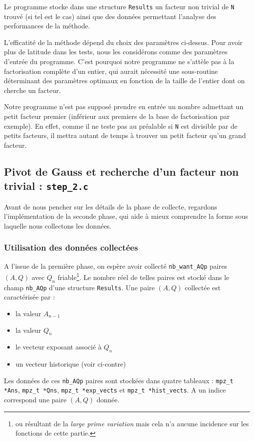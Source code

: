 Le programme stocke dans une structure \texttt{Results} un facteur non trivial
de \texttt{N} trouvé (si tel est le cas) ainsi que des données permettant 
l'analyse des performances de la méthode.  

\begin{remarque}
L'efficatité de la méthode dépend du choix des paramètres ci-dessus. Pour avoir
plus de latitude dans les tests, nous les considérons comme des paramètres 
d'entrée du programme. C'est pourquoi notre programme ne s'attèle pas à la
factorisation complète d'un entier, qui aurait nécessité une sous-routine 
déterminant des paramètres optimaux en fonction de la taille de l'entier 
dont on cherche un facteur. 
   
\end{remarque}

\begin{remarque}
Notre programme n'est pas supposé prendre en entrée un nombre admettant un petit
facteur premier (inférieur aux premiers de la base de factorisation par exemple).
En effet, comme il ne teste pas au préalable si \texttt{N} est divisible par de 
petits facteurs, il mettra autant de temps à trouver un petit facteur qu'un
grand facteur.
\end{remarque}

\newpage 
\subsection{Pivot de Gauss et recherche d'un facteur non trivial
            : \texttt{step\_2.c}}

Avant de nous pencher sur les détails de la phase de collecte, regardons 
l'implémentation de la seconde phase, qui aide à mieux comprendre la 
forme sous laquelle nous collectons les données.

\subsubsection{Utilisation des données collectées}
A l'issue de la première
phase, on espère avoir collecté \texttt{nb\_want\_AQp} paires $(A,Q)$ avec
$Q_n$ friable\footnote{ou résultant de la \textit{large prime variation} mais 
cela n'a aucune incidence sur les fonctions de cette partie.}. Le nombre
réel de telles paires est stocké dans le champ \texttt{nb\_AQp} d'une structure
\texttt{Results}. Une paire $(A,Q)$ collectée est caractérisée par :

\begin{itemize}
    \item la valeur $A_{n-1}$
    \item la valeur $Q_n$
    \item le vecteur exposant associé à $Q_n$
    \item un vecteur historique (voir ci-contre)
\end{itemize}
Les données de ces \texttt{nb\_AQp} paires sont stockées dans
quatre tableaux : \texttt{mpz\_t *Ans}, \texttt{mpz\_t *Qns}, 
\texttt{mpz\_t *exp\_vects} et \texttt{mpz\_t *hist\_vects}.
A un indice correspond une paire $(A,Q)$ donnée. \\


